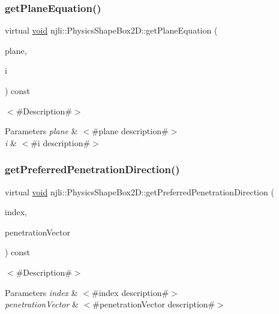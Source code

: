 \subsubsection{\texorpdfstring{get\+Plane\+Equation()}{getPlaneEquation()}}
{\footnotesize\ttfamily virtual \mbox{\hyperlink{_thread_8h_af1e856da2e658414cb2456cb6f7ebc66}{void}} njli\+::\+Physics\+Shape\+Box2\+D\+::get\+Plane\+Equation (\begin{DoxyParamCaption}\item[{bt\+Vector4 \&}]{plane,  }\item[{int}]{i }\end{DoxyParamCaption}) const\hspace{0.3cm}{\ttfamily [virtual]}}

$<$\#\+Description\#$>$


\begin{DoxyParams}{Parameters}
{\em plane} & $<$\#plane description\#$>$ \\
\hline
{\em i} & $<$\#i description\#$>$ \\
\hline
\end{DoxyParams}
\mbox{\label{classnjli_1_1_physics_shape_box2_d_aaab48e4259b37f9c13739982ef5b4904}} 
\subsubsection{\texorpdfstring{get\+Preferred\+Penetration\+Direction()}{getPreferredPenetrationDirection()}}
{\footnotesize\ttfamily virtual \mbox{\hyperlink{_thread_8h_af1e856da2e658414cb2456cb6f7ebc66}{void}} njli\+::\+Physics\+Shape\+Box2\+D\+::get\+Preferred\+Penetration\+Direction (\begin{DoxyParamCaption}\item[{int}]{index,  }\item[{bt\+Vector3 \&}]{penetration\+Vector }\end{DoxyParamCaption}) const\hspace{0.3cm}{\ttfamily [virtual]}}

$<$\#\+Description\#$>$


\begin{DoxyParams}{Parameters}
{\em index} & $<$\#index description\#$>$ \\
\hline
{\em penetration\+Vector} & $<$\#penetration\+Vector description\#$>$ \\
\hline
\end{DoxyParams}
\mbox{\label{classnjli_1_1_physics_shape_box2_d_a2e9e4d1090ea0041f87e4ac4b040ec34}} 
